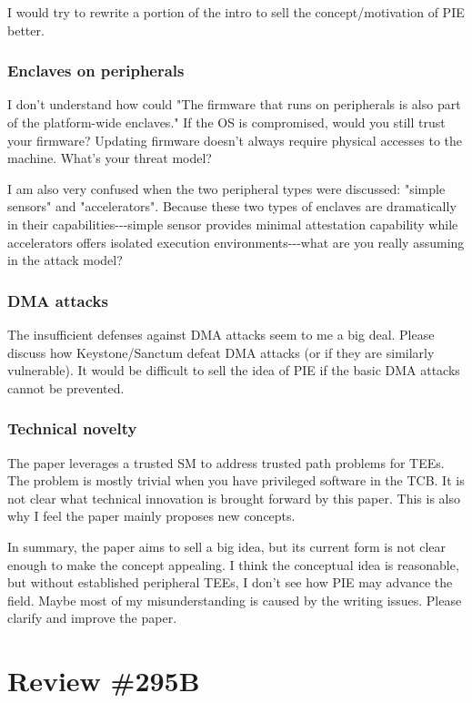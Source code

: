 \documentclass[9pt]{article}
\begin{document}
I would try to rewrite a portion of the intro to sell the
concept/motivation of PIE better.

\subsubsection{Enclaves on peripherals}

I don't understand how could "The firmware that runs on peripherals is
also part of the platform-wide enclaves." If the OS is compromised,
would you still trust your firmware? Updating firmware doesn't always
require physical accesses to the machine. What's your threat model?

I am also very confused when the two peripheral types were discussed:
"simple sensors" and "accelerators". Because these two types of enclaves
are dramatically in their capabilities-\/-\/-simple sensor provides
minimal attestation capability while accelerators offers isolated
execution environments-\/-\/-what are you really assuming in the attack
model?

\subsubsection{DMA attacks}

The insufficient defenses against DMA attacks seem to me a big deal.
Please discuss how Keystone/Sanctum defeat DMA attacks (or if they are
similarly vulnerable). It would be difficult to sell the idea of PIE if
the basic DMA attacks cannot be prevented.

\subsubsection{Technical novelty}

The paper leverages a trusted SM to address trusted path problems for
TEEs. The problem is mostly trivial when you have privileged software in
the TCB. It is not clear what technical innovation is brought forward by
this paper. This is also why I feel the paper mainly proposes new
concepts.

In summary, the paper aims to sell a big idea, but its current form is
not clear enough to make the concept appealing. I think the conceptual
idea is reasonable, but without established peripheral TEEs, I don't see
how PIE may advance the field. Maybe most of my misunderstanding is
caused by the writing issues. Please clarify and improve the paper.

\section{Review \#295B}
\end{document}
